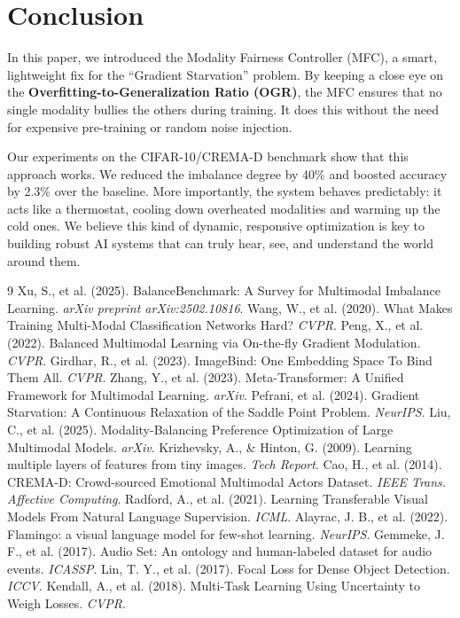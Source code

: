 \documentclass[10pt, twocolumn, letterpaper]{article}
\begin{document}
\section{Conclusion}
In this paper, we introduced the Modality Fairness Controller (MFC), a smart, lightweight fix for the ``Gradient Starvation'' problem. By keeping a close eye on the \textbf{Overfitting-to-Generalization Ratio (OGR)}, the MFC ensures that no single modality bullies the others during training. It does this without the need for expensive pre-training or random noise injection.

Our experiments on the CIFAR-10/CREMA-D benchmark show that this approach works. We reduced the imbalance degree by 40\% and boosted accuracy by 2.3\% over the baseline. More importantly, the system behaves predictably: it acts like a thermostat, cooling down overheated modalities and warming up the cold ones. We believe this kind of dynamic, responsive optimization is key to building robust AI systems that can truly hear, see, and understand the world around them.

\begin{thebibliography}{9}
Xu, S., et al. (2025). BalanceBenchmark: A Survey for Multimodal Imbalance Learning. \textit{arXiv preprint arXiv:2502.10816}.
Wang, W., et al. (2020). What Makes Training Multi-Modal Classification Networks Hard? \textit{CVPR}.
Peng, X., et al. (2022). Balanced Multimodal Learning via On-the-fly Gradient Modulation. \textit{CVPR}.
Girdhar, R., et al. (2023). ImageBind: One Embedding Space To Bind Them All. \textit{CVPR}.
Zhang, Y., et al. (2023). Meta-Transformer: A Unified Framework for Multimodal Learning. \textit{arXiv}.
Pefrani, et al. (2024). Gradient Starvation: A Continuous Relaxation of the Saddle Point Problem. \textit{NeurIPS}.
Liu, C., et al. (2025). Modality-Balancing Preference Optimization of Large Multimodal Models. \textit{arXiv}.
Krizhevsky, A., \& Hinton, G. (2009). Learning multiple layers of features from tiny images. \textit{Tech Report}.
Cao, H., et al. (2014). CREMA-D: Crowd-sourced Emotional Multimodal Actors Dataset. \textit{IEEE Trans. Affective Computing}.
Radford, A., et al. (2021). Learning Transferable Visual Models From Natural Language Supervision. \textit{ICML}.
Alayrac, J. B., et al. (2022). Flamingo: a visual language model for few-shot learning. \textit{NeurIPS}.
Gemmeke, J. F., et al. (2017). Audio Set: An ontology and human-labeled dataset for audio events. \textit{ICASSP}.
Lin, T. Y., et al. (2017). Focal Loss for Dense Object Detection. \textit{ICCV}.
Kendall, A., et al. (2018). Multi-Task Learning Using Uncertainty to Weigh Losses. \textit{CVPR}.
\end{thebibliography}
\end{document}
